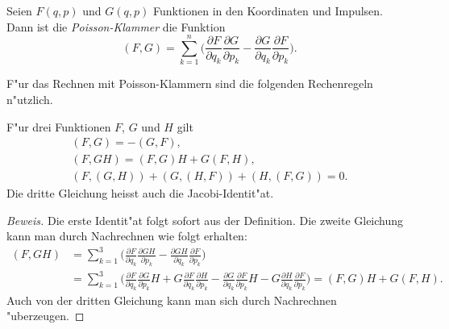 \begin{definition}
Seien $F(q,p)$ und $G(q,p)$ Funktionen in den Koordinaten und Impulsen. 
Dann ist die {\em Poisson-Klammer} die Funktion
\[
(F,G)
=
\sum_{k=1}^n
\biggl(
\frac{\partial F}{\partial q_k}\frac{\partial G}{\partial p_k}
-
\frac{\partial G}{\partial q_k}\frac{\partial F}{\partial p_k}
\biggr).
\]
\end{definition}

F"ur das Rechnen mit Poisson-Klammern sind die folgenden Rechenregeln
n"utzlich.
\begin{satz}
F"ur drei Funktionen $F$, $G$ und $H$ gilt
\begin{gather}
(F,G)=-(G,F),
\label{skript:poisson-antisymmetrie}
\\
(F,GH)
=
(F,G)H+G(F,H),
\label{skript:poisson-derivation}
\\
(F,(G,H))
+
(G,(H,F))
+
(H,(F,G))
=0.
\label{skript:poisson-jacobi}
\end{gather}
Die dritte Gleichung heisst auch die Jacobi-Identit"at.
\end{satz}

\begin{proof}[Beweis]
Die erste Identit"at folgt sofort aus der Definition.
Die zweite Gleichung kann man durch Nachrechnen wie folgt erhalten:
\begin{align*}
(F,GH)
&=
\sum_{k=1}^3 \biggl(
\frac{\partial F}{\partial q_k}\frac{\partial GH}{\partial p_k}
-
\frac{\partial GH}{\partial q_k}\frac{\partial F}{\partial p_k}
\biggr)
\\
&=
\sum_{k=1}^3 \biggl(
\frac{\partial F}{\partial q_k}\frac{\partial G}{\partial p_k}H
+
G\frac{\partial F}{\partial q_k}\frac{\partial H}{\partial p_k}
-
\frac{\partial G}{\partial q_k}\frac{\partial F}{\partial p_k}H
-
G\frac{\partial H}{\partial q_k}\frac{\partial F}{\partial p_k}
\biggr)
=(F,G)H + G(F,H).
\end{align*}
Auch von der dritten Gleichung kann man sich durch Nachrechnen
"uberzeugen.
\end{proof}

